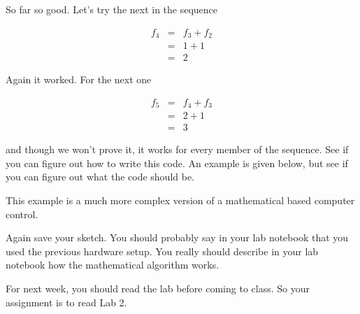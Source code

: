 So far so good. Let's try the next in the sequence

\begin{eqnarray*}
	f_{4} &=&f_{3}+f_{2} \\
	&=&1+1 \\
	&=&2
\end{eqnarray*}

Again it worked. For the next one

\begin{eqnarray*}
	f_{5} &=&f_{4}+f_{3} \\
	&=&2+1 \\
	&=&3
\end{eqnarray*}

and though we won't prove it, it works for every member of the sequence. See
if you can figure out how to write this code. An example is given below, but
see if you can figure out what the code should be.

This example is a much more complex version of a mathematical based computer
control.



Again save your sketch. You should probably say in your lab notebook that
you used the previous hardware setup. You really should describe in your lab
notebook how the mathematical algorithm works.

For next week, you should read the lab before coming to class. So your
assignment is to read Lab 2.

\vspace*{\fill}
\pagebreak
